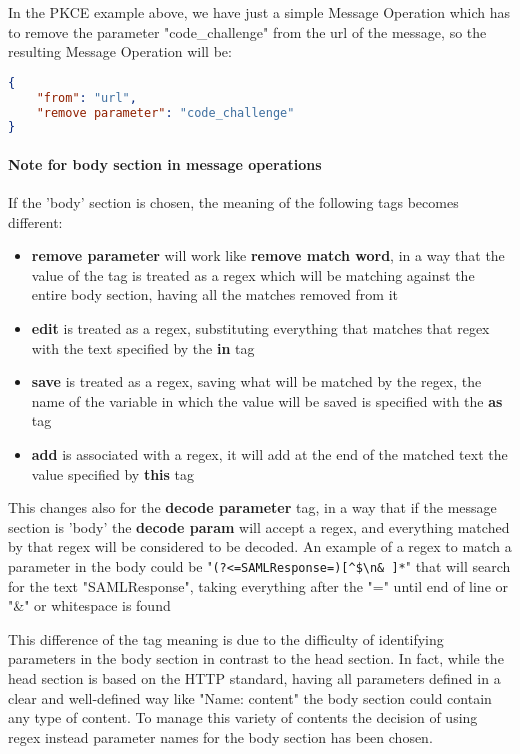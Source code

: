In the PKCE example above, we have just a simple Message Operation which has to remove the parameter "code\_challenge" from the url of the message, so the resulting Message Operation will be:
\begin{lstlisting}[language=json, caption=Message Operation definition]
{
    "from": "url",
    "remove parameter": "code_challenge"
}
\end{lstlisting}

\paragraph{Note for body section in message operations}
If the 'body' section is chosen, the meaning of the following tags becomes different:
\begin{itemize}
    \item \textbf{remove parameter} will work like \textbf{remove match word}, in a way that the value of the tag is treated as a regex which will be matching against the entire body section, having all the matches removed from it
    \item \textbf{edit} is treated as a regex, substituting everything that matches that regex with the text specified by the \textbf{in} tag
    \item \textbf{save} is treated as a regex, saving what will be matched by the regex, the name of the variable in which the value will be saved is specified with the \textbf{as} tag
    \item \textbf{add} is associated with a regex, it will add at the end of the matched text the value specified by \textbf{this} tag
\end{itemize}

This changes also for the \textbf{decode parameter} tag, in a way that if the message section is 'body' the \textbf{decode param} will accept a regex, and everything matched by that regex will be considered to be decoded. An example of a regex to match a parameter in the body could be 
"\verb|(?<=SAMLResponse=)[^$\n& ]*|"
that will search for the text "SAMLResponse", taking everything after the "=" until end of line or "\&" or whitespace is found

This difference of the tag meaning is due to the difficulty of identifying parameters in the body section in contrast to the head section. In fact, while the head section is based on the HTTP standard, having all parameters defined in a clear and well-defined way like "Name: content" the body section could contain any type of content. To manage this variety of contents the decision of using regex instead parameter names for the body section has been chosen.

